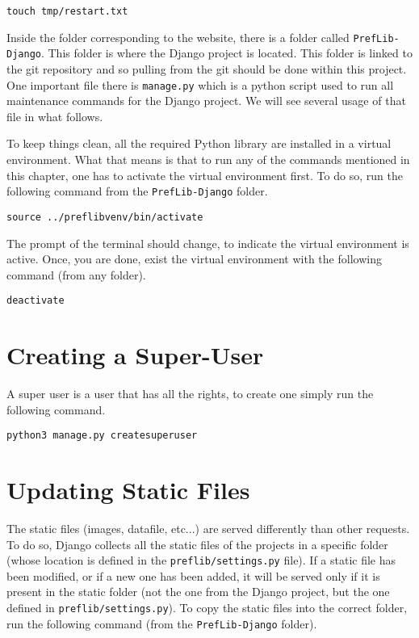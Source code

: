 \documentclass{report}
\begin{document}
	\begin{center}
		\texttt{touch tmp/restart.txt}
	\end{center}

	Inside the folder corresponding to the website, there is a folder called \texttt{PrefLib-Django}. This folder is where the Django project is located. This folder is linked to the git repository and so pulling from the git should be done within this project. One important file there is \texttt{manage.py} which is a python script used to run all maintenance commands for the Django project. We will see several usage of that file in what follows.
	
	To keep things clean, all the required Python library are installed in a virtual environment. What that means is that to run any of the commands mentioned in this chapter, one has to activate the virtual environment first. To do so, run the following command from the \texttt{PrefLib-Django} folder.
	
	\begin{center}
		\texttt{source ../preflibvenv/bin/activate}
	\end{center}

	\noindent The prompt of the terminal should change, to indicate the virtual environment is active. Once, you are done, exist the virtual environment with the following command (from any folder).
	
	\begin{center}
		\texttt{deactivate}
	\end{center}
	
	\section{Creating a Super-User}
	
	A super user is a user that has all the rights, to create one simply run the following command.
	
	\begin{center}
		\texttt{python3 manage.py createsuperuser}
	\end{center}
	
	\section{Updating Static Files}
	
	The static files (images, datafile, etc...) are served differently than other requests. To do so, Django collects all the static files of the projects in a specific folder (whose location is defined in the \texttt{preflib/settings.py} file). If a static file has been modified, or if a new one has been added, it will be served only if it is present in the static folder (not the one from the Django project, but the one defined in \texttt{preflib/settings.py}). To copy the static files into the correct folder, run the following command (from the \texttt{PrefLib-Django} folder).
	
\end{document}
